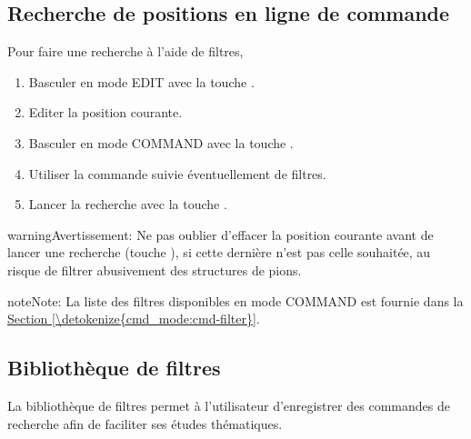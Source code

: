 \documentclass[letterpaper,10pt,french]{sphinxmanual}
\begin{document}
\subsection{Recherche de positions en ligne de commande}
\label{\detokenize{annexe_filtres:recherche-de-positions-en-ligne-de-commande}}
\sphinxAtStartPar
Pour faire une recherche à l’aide de filtres,
\begin{enumerate}
%
\item {} 
\sphinxAtStartPar
Basculer en mode EDIT avec la touche .

\item {} 
\sphinxAtStartPar
Editer la position courante.

\item {} 
\sphinxAtStartPar
Basculer en mode COMMAND avec la touche .

\item {} 
\sphinxAtStartPar
Utiliser la commande  suivie éventuellement de filtres.

\item {} 
\sphinxAtStartPar
Lancer la recherche avec la touche .

\end{enumerate}

\begin{sphinxadmonition}{warning}{Avertissement:}
\sphinxAtStartPar
Ne pas oublier d’effacer la position courante avant de lancer une recherche
(touche ), si cette dernière n’est pas celle souhaitée, au
risque de filtrer abusivement des structures de pions.
\end{sphinxadmonition}

\begin{sphinxadmonition}{note}{Note:}
\sphinxAtStartPar
La liste des filtres disponibles en mode COMMAND est fournie dans la
\hyperref[\detokenize{cmd_mode:cmd-filter}]{Section \ref{\detokenize{cmd_mode:cmd-filter}}}.
\end{sphinxadmonition}


\subsection{Bibliothèque de filtres}
\label{\detokenize{annexe_filtres:bibliotheque-de-filtres}}
\sphinxAtStartPar
La bibliothèque de filtres permet à l’utilisateur d’enregistrer des commandes de recherche
afin de faciliter ses études thématiques.
\end{document}
